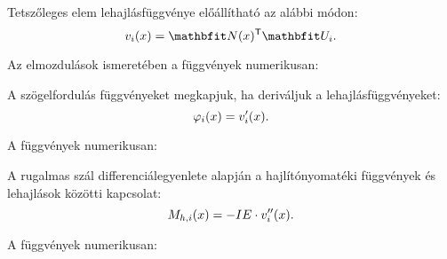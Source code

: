 Tetszőleges elem lehajlásfüggvénye előállítható az alábbi módon:
\begin{equation}
  v_i(x) = \rvec N(x)^{\mathsf T} \rvec U_i
  \text.
  \label{eq:v-param}
\end{equation}

Az elmozdulások ismeretében a függvények numerikusan:


A szögelfordulás függvényeket megkapjuk, ha deriváljuk a lehajlásfüggvényeket:
\begin{equation}
  \varphi_i(x) = v_i'(x)
  \text.
  \label{eq:phi-param}
\end{equation}

A függvények numerikusan:


A rugalmas szál differenciálegyenlete alapján a hajlítónyomatéki függvények
és lehajlások közötti kapcsolat:
\begin{equation}
  M_{h,i}(x) = -IE \cdot v_i''(x)
  \text.
  \label{eq:Mh-param}
\end{equation}

A függvények numerikusan:

